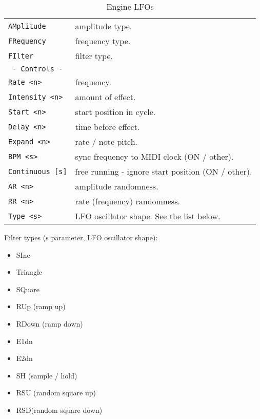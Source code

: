    \begin{table}[H]
      \centering
      \caption{Engine LFOs}
      \label{table:yoshimi_engine_lfos}
      \begin{tabular}{l l}

\texttt{AMplitude} &
   amplitude type. \\
\texttt{FRequency} &
   frequency type. \\
\texttt{FIlter} &
   filter type. \\
\texttt{ - Controls - } & \\
\texttt{Rate <n>} &
   frequency. \\
\texttt{Intensity <n>} &
   amount of effect. \\
\texttt{Start <n>} &
   start position in cycle. \\
\texttt{Delay <n>} &
   time before effect. \\
\texttt{Expand <n>} &
   rate / note pitch. \\
\texttt{BPM <s>} &
   sync frequency to MIDI clock (ON / other). \\
\texttt{Continuous [s]} &
   free running - ignore start position (ON / other). \\
\texttt{AR <n>} &
   amplitude randomness. \\
\texttt{RR <n>} &
   rate (frequency) randomness. \\
\texttt{Type <s>} &
   LFO oscillator shape. See the list below. \\

      \end{tabular}
   \end{table}

Filter types (s parameter, LFO oscillator shape):

   \begin{itemize}
      \item SIne
      \item Triangle
      \item SQuare
      \item RUp (ramp up)
      \item RDown (ramp down)
      \item E1dn
      \item E2dn
      \item SH (sample / hold)
      \item RSU (random square up)
      \item RSD(random square down)
   \end{itemize}

